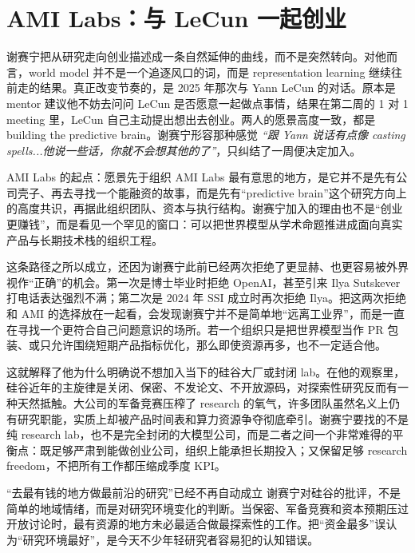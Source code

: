 \section{AMI Labs：与 LeCun 一起创业}

谢赛宁把从研究走向创业描述成一条自然延伸的曲线，而不是突然转向。对他而言，world model 并不是一个追逐风口的词，而是 representation learning 继续往前走的结果。真正改变节奏的，是 2025 年那次与 Yann LeCun 的对话。原本是 mentor 建议他不妨去问问 LeCun 是否愿意一起做点事情，结果在第二周的 1 对 1 meeting 里，LeCun 自己主动提出想出去创业。两人的愿景高度一致，都是 building the predictive brain。谢赛宁形容那种感觉 \textit{``跟 Yann 说话有点像 casting spells...他说一些话，你就不会想其他的了''}，只纠结了一周便决定加入。

\begin{importantbox}{AMI Labs 的起点：愿景先于组织}
AMI Labs 最有意思的地方，是它并不是先有公司壳子、再去寻找一个能融资的故事，而是先有“predictive brain”这个研究方向上的高度共识，再据此组织团队、资本与执行结构。谢赛宁加入的理由也不是“创业更赚钱”，而是看见一个罕见的窗口：可以把世界模型从学术命题推进成面向真实产品与长期技术栈的组织工程。
\end{importantbox}

这条路径之所以成立，还因为谢赛宁此前已经两次拒绝了更显赫、也更容易被外界视作“正确”的机会。第一次是博士毕业时拒绝 OpenAI，甚至引来 Ilya Sutskever 打电话表达强烈不满；第二次是 2024 年 SSI 成立时再次拒绝 Ilya。把这两次拒绝和 AMI 的选择放在一起看，会发现谢赛宁并不是简单地“远离工业界”，而是一直在寻找一个更符合自己问题意识的场所。若一个组织只是把世界模型当作 PR 包装、或只允许围绕短期产品指标优化，那么即使资源再多，也不一定适合他。

这就解释了他为什么明确说不想加入当下的硅谷大厂或封闭 lab。在他的观察里，硅谷近年的主旋律是关闭、保密、不发论文、不开放源码，对探索性研究反而有一种天然抵触。大公司的军备竞赛压榨了 research 的氧气，许多团队虽然名义上仍有研究职能，实质上却被产品时间表和算力资源争夺彻底牵引。谢赛宁要找的不是纯 research lab，也不是完全封闭的大模型公司，而是二者之间一个非常难得的平衡点：既足够严肃到能做创业公司，组织上能承担长期投入；又保留足够 research freedom，不把所有工作都压缩成季度 KPI。

\begin{warningbox}{“去最有钱的地方做最前沿的研究”已经不再自动成立}
谢赛宁对硅谷的批评，不是简单的地域情绪，而是对研究环境变化的判断。当保密、军备竞赛和资本预期压过开放讨论时，最有资源的地方未必最适合做最探索性的工作。把“资金最多”误认为“研究环境最好”，是今天不少年轻研究者容易犯的认知错误。
\end{warningbox}

